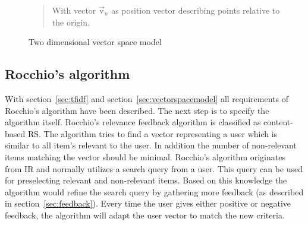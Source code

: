 \begin{figure}[h]
    \begin{quote}
        With vector $\vec{\text{v}}_n$ as position vector describing points relative to the origin.
    \end{quote}
    \center

    \caption{Two dimensional vector space model}
    \label{fig:vectorspacemodel}
\end{figure}


\iffalse
\subsubsection{Parametric and zone indices}
\label{sec:parametricandzoneindices}
\fi



\subsection{Rocchio's algorithm}
\label{sec:rocchio}
With section~\ref{sec:tfidf} and section~\ref{sec:vectorspacemodel} all requirements of Rocchio's algorithm have been described.\citep[p.~178]{manning:2009}
The next step is to specify the algorithm itself.
Rocchio's relevance feedback algorithm is classified as content-based RS.\citep[p.~92]{lops:2011}
The algorithm tries to find a vector representing a user which is similar to all item's relevant to the user.
In addition the number of non-relevant items matching the vector should be minimal.
Rocchio's algorithm originates from IR and normally utilizes a search query from a user.
This query can be used for preselecting relevant and non-relevant items.
Based on this knowledge the algorithm would refine the search query by gathering more feedback (as described in section~\ref{sec:feedback}).
\citep[p.~178-182]{manning:2009}
Every time the user gives either positive or negative feedback, the algorithm will adapt the user vector to match the new criteria.\citep[p.~387-388]{pazzani:2007}

